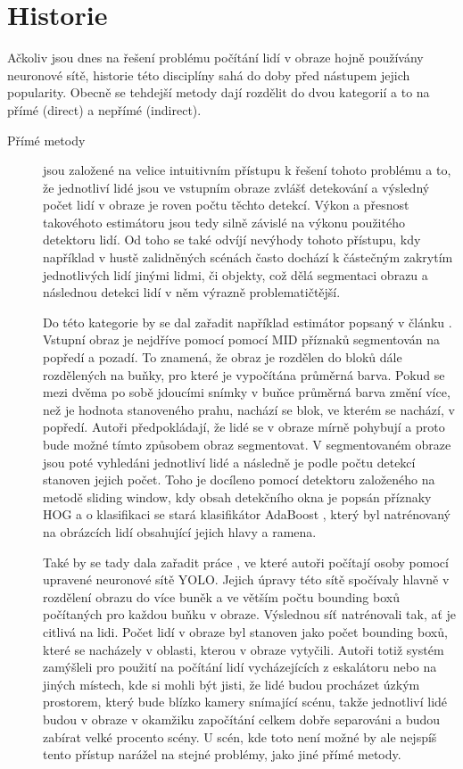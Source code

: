 \chapter{Historie}
\label{sec:History}

Ačkoliv jsou dnes na řešení problému počítání lidí v obraze hojně používány neuronové sítě, historie této disciplíny sahá do doby před nástupem jejich popularity.
Obecně se tehdejší metody dají rozdělit do dvou kategorií a to na přímé (direct) a nepřímé (indirect).

\begin{description}

\item[Přímé metody] jsou založené na velice intuitivním přístupu k řešení tohoto problému a to, že jednotliví lidé jsou ve vstupním obraze zvlášť detekování a výsledný počet lidí v obraze je roven počtu těchto detekcí. Výkon a přesnost takovéhoto estimátoru jsou tedy silně závislé na výkonu použitého detektoru lidí.
Od toho se také odvíjí nevýhody tohoto přístupu, kdy například v hustě zalidněných scénách často dochází k částečným zakrytím jednotlivých lidí jinými lidmi, či objekty, což dělá segmentaci obrazu a následnou detekci lidí v něm výrazně problematičtější.

Do této kategorie by se dal zařadit například estimátor popsaný v článku \cite{head_and_shoulders}.
Vstupní obraz je nejdříve pomocí pomocí MID příznaků segmentován na popředí a pozadí.
To znamená, že obraz je rozdělen do bloků dále rozdělených na buňky, pro které je vypočítána průměrná barva. Pokud se mezi dvěma po sobě jdoucími snímky v buňce průměrná barva změní více, než je hodnota stanoveného prahu, nachází se blok, ve kterém se nachází, v popředí.
Autoři předpokládají, že lidé se v obraze mírně pohybují a proto bude možné tímto způsobem obraz segmentovat.
V segmentovaném obraze jsou poté vyhledáni jednotliví lidé a následně je podle počtu detekcí stanoven jejich počet.
Toho je docíleno pomocí detektoru založeného na metodě sliding window, kdy obsah detekčního okna je popsán příznaky HOG a o klasifikaci se stará klasifikátor AdaBoost \cite{AdaBoost}, který byl natrénovaný na obrázcích lidí obsahující jejich hlavy a ramena.

Také by se tady dala zařadit práce \cite{YOLO_counting}, ve které autoři počítají osoby pomocí upravené neuronové sítě YOLO.
Jejich úpravy této sítě spočívaly hlavně v rozdělení obrazu do více buněk a ve větším počtu bounding boxů počítaných pro každou buňku v obraze. Výslednou síť natrénovali tak, ať je citlivá na lidi.
Počet lidí v obraze byl stanoven jako počet bounding boxů, které se nacházely v oblasti, kterou v obraze vytyčili.
Autoři totiž systém zamýšleli pro použití na počítání lidí vycházejících z eskalátoru nebo na jiných místech, kde si mohli být jisti, že lidé budou procházet úzkým prostorem, který bude blízko kamery snímající scénu, takže jednotliví lidé budou v obraze v okamžiku započítání celkem dobře separováni a budou zabírat velké procento scény.
U scén, kde toto není možné by ale nejspíš tento přístup narážel na stejné problémy, jako jiné přímé metody.



\end{description}
